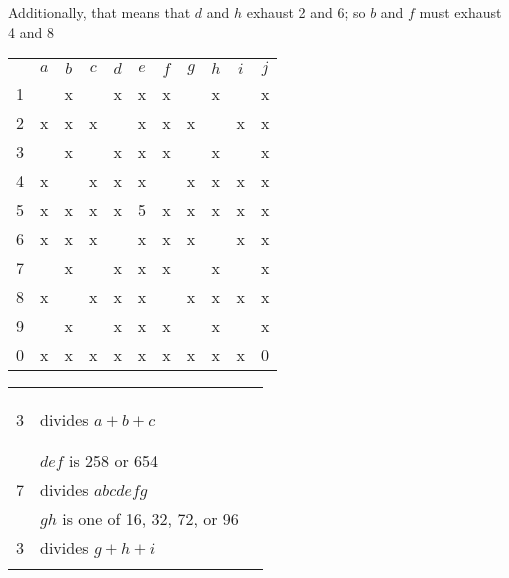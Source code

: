 Additionally, that means that $d$ and $h$ exhaust 2 and 6; so $b$ and $f$ must exhaust 4 and 8
\begin{center}
\begin{tabular}{ccccccccccc}
			&	$a$	&	$b$	&	$c$	&	$d$	&	$e$	&	$f$	&	$g$	&	$h$	&	$i$	&	$j$	\\
	1		&		&	x	&		&	x	&	x	&	x	&		&	x	&		&	x	\\
	2		&	x	&	x	&	x	&		&	x	&	x	&	x	&		&	x	&	x	\\
	3		&		&	x	&		&	x	&	x	&	x	&		&	x	&		&	x	\\
	4		&	x	&		&	x	&	x	&	x	&		&	x	&	x	&	x	&	x	\\
	5		&	x	&	x	&	x	&	x	&	5	&	x	&	x	&	x	&	x	&	x	\\
	6		&	x	&	x	&	x	&		&	x	&	x	&	x	&		&	x	&	x	\\
	7		&		&	x	&		&	x	&	x	&	x	&		&	x	&		&	x	\\
	8		&	x	&		&	x	&	x	&	x	&		&	x	&	x	&	x	&	x	\\
	9		&		&	x	&		&	x	&	x	&	x	&		&	x	&		&	x	\\
	0		&	x	&	x	&	x	&	x	&	x	&	x	&	x	&	x	&	x	&	0	\\
\end{tabular}
\hspace{1cm}\vline\hspace{1cm}
\begin{tabular}{rll}
	& 		\\
	& 		\\
	& 		\\
	3	&	divides $a+b+c$		\\
	& 		\\
	&		\\
	&	$def$ is 258 or 654		\\
	7	&	divides $abcdefg$	\\
		&	$gh$ is one of 16, 32, 72, or 96 \\
	3	&	divides $g+h+i$		\\
		&	
\end{tabular}
\end{center}

